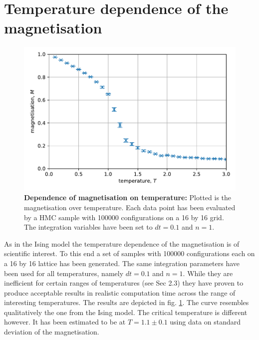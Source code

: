 \documentclass[11pt, a4paper]{scrartcl}
\begin{document}
\section{Temperature dependence of the magnetisation}
    \begin{figure}
    \begin{centering}
        \includegraphics{m_over_T.pdf}
        \caption{\textbf{Dependence of magnetisation on temperature: } Plotted is the magnetisation over temperature. Each data point has been evaluated by a HMC sample with 100000 configurations on a 16 by 16 grid. The integration variables have been set to $dt = 0.1$ and $n = 1$.}
    \end{centering}
    \label{m_over_T}
    \end{figure}
    As in the Ising model the temperature dependence of the magnetisation is of scientific interest. To this end a set of samples with 100000 configurations each on a 16 by 16 lattice has been generated. The same integration parameters have been used for all temperatures, namely $dt = 0.1$ and $n = 1$. While they are inefficient for certain ranges of temperatures (see Sec 2.3) they have proven to produce acceptable results in realistic computation time across the range of interesting temperatures. The results are depicted in fig. \ref{m_over_T}. The curve resembles qualitatively the one from the Ising model. The critical temperature is different however. It has been estimated to be at $T = 1.1 \pm 0.1$ using data on standard deviation of the magnetisation. 
\end{document}
